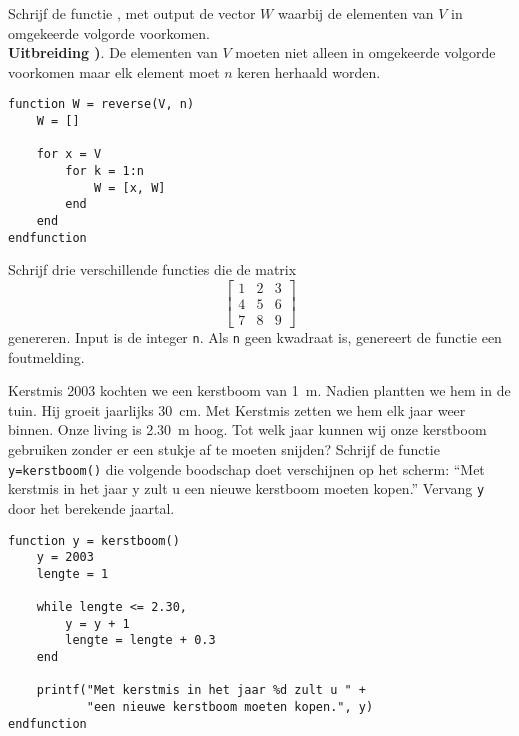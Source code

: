 \begin{oef}
Schrijf de functie , met output de vector $W$ 
waarbij de elementen van $V$ in omgekeerde volgorde voorkomen.\\
\textbf{Uitbreiding  )}. De elementen van $V$ 
moeten niet alleen in omgekeerde volgorde voorkomen maar elk element 
moet $n$ keren herhaald worden.

\begin{opl}
\begin{lstlisting}
function W = reverse(V, n)
    W = []
    
    for x = V
        for k = 1:n
            W = [x, W]
        end
    end
endfunction
\end{lstlisting}
\end{opl}
\end{oef}

\begin{oef}
Schrijf drie verschillende functies die de matrix 
\begin{equation*}
\begin{bmatrix}
 1&2  &3  \\
 4& 5 &6 \\
 7& 8 &9
\end{bmatrix}
\end{equation*}
genereren. Input is de integer \verb+n+. Als \verb+n+ geen kwadraat is, genereert de functie een foutmelding.
\end{oef}

\begin{oef}
Kerstmis 2003 kochten we een kerstboom van \SI{1}{\meter}. Nadien plantten we hem in de tuin. Hij groeit jaarlijks \SI{30}{\centi\meter}. Met Kerstmis zetten we hem elk jaar weer binnen. Onze living is \SI{2,30}{\meter} hoog. Tot welk jaar kunnen wij onze kerstboom gebruiken zonder er een stukje af te moeten snijden? Schrijf de functie \verb/y=kerstboom()/ die volgende boodschap doet verschijnen op het scherm: ``Met kerstmis in het jaar y zult u een nieuwe kerstboom moeten kopen.'' Vervang \verb/y/ door het berekende jaartal.
\begin{opl}
\begin{lstlisting}
function y = kerstboom()
    y = 2003
    lengte = 1
    
    while lengte <= 2.30,
        y = y + 1
        lengte = lengte + 0.3
    end
    
    printf("Met kerstmis in het jaar %d zult u " +
           "een nieuwe kerstboom moeten kopen.", y)
endfunction
\end{lstlisting}
\end{opl}
\end{oef}


